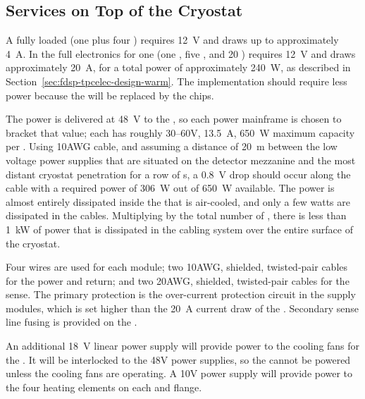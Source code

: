 

\subsection{Services on Top of the Cryostat}
\label{sec:fdsp-tpcelec-design-services}

A fully loaded  (one  plus four ) 
requires \SI{12}{V} and draws up to approximately \SI{4}{A}.  In 
 the full electronics for one  (one , 
five , and \num{20} ) requires \SI{12}{V} and 
draws approximately \SI{20}{A}, for a total power of approximately 
\SI{240}{W}, as described in Section~\ref{sec:fdsp-tpcelec-design-warm}. 
The  implementation should require less power because 
the  will be replaced by the  chips.

The  power is delivered at \SI{48}{V} to the , 
so each  power mainframe is chosen to bracket that value; 
each has roughly \numrange{30}{60}{V}, \SI{13.5}{A}, \SI{650}{W} 
maximum capacity per . Using 10AWG cable, and assuming
a distance of \SI{20}{m} between the low voltage power supplies 
that are situated on the detector mezzanine and the most distant
cryostat penetration for a row of s, a \SI{0.8}{V} 
drop should occur along the cable with a required power of 
\SI{306}{W} out of \SI{650}{W} available. The power is almost entirely
dissipated inside the  that is air-cooled, and
only a few watts are dissipated in the cables. Multiplying by
the total number of , there is less than \SI{1}{kW} of
power that is dissipated in the cabling system over the entire
surface of the cryostat.

Four wires are used for each module; two 10AWG, shielded, twisted-pair 
cables for the power and return; and two 20AWG, shielded, twisted-pair 
cables for the sense. The primary protection is the over-current 
protection circuit in the  supply modules, which is set 
higher than the \SI{20}{A} current draw of the . 
Secondary sense line fusing is provided on the .  

An additional \SI{18}{V} linear power supply will provide power to the 
cooling fans for the . It will be interlocked to the 48V 
power supplies, so the  cannot be powered unless the cooling 
fans are operating. A \SI{10}{}V power supply will provide power to the four 
heating elements on each  and  flange.

